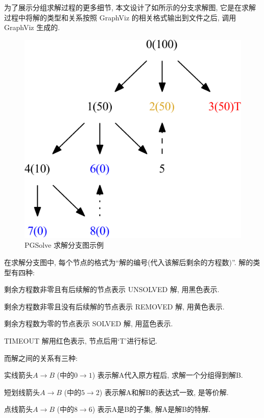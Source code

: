 为了展示分组求解过程的更多细节, 本文设计了如所示的分支求解图, 它是在求解过程中将解的类型和关系按照 GraphViz\cite{ellson2001graphviz} 的相关格式输出到文件之后, 调用 GraphViz 生成的. 
\begin{figure}[htbp]
\centering
\includegraphics[width=.55\textwidth]{fig/NS1L-sample.pdf}
\caption{PGSolve 求解分支图示例}\label{ns1l-sample}
\end{figure}

在求解分支图中, 每个节点的格式为``解的编号(代入该解后剩余的方程数)''. 解的类型有四种: 
\begin{compactitem}[\textbullet]
\item 剩余方程数非零且有后续解的节点表示 UNSOLVED 解, 用黑色表示.
\item 剩余方程数非零且没有后续解的节点表示 REMOVED 解, 用黄色表示.
\item 剩余方程数为零的节点表示 SOLVED 解, 用蓝色表示.
\item TIMEOUT 解用红色表示, 节点后用`T'进行标记. 
\end{compactitem}
而解之间的关系有三种:
\begin{compactitem}[\textbullet]
\item 实线箭头$A\rightarrow B$ (中的$0\rightarrow 1$) 表示解A代入原方程后, 求解一个分组得到解B. 
\item 短划线箭头$A\rightarrow B$ (中的$5\rightarrow 2$) 表示解A和解B的表达式一致, 是等价解. 
\item 点线箭头$A\rightarrow B$ (中的$8\rightarrow 6$) 表示A是B的子集, 解A是解B的特解.  
\end{compactitem}

